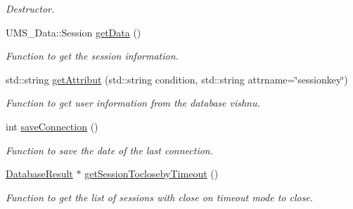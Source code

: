 \begin{DoxyCompactItemize}
\begin{DoxyCompactList}\small\item\em Destructor. \item\end{DoxyCompactList}\item 
UMS\_\-Data::Session \hyperlink{classSessionServer_a4c23b390fd8d49b83f34a57c1d7e1b23}{getData} ()
\begin{DoxyCompactList}\small\item\em Function to get the session information. \item\end{DoxyCompactList}\item 
std::string \hyperlink{classSessionServer_af3fce86cf1e28afee1b44ac35b925925}{getAttribut} (std::string condition, std::string attrname=\char`\"{}sessionkey\char`\"{})
\begin{DoxyCompactList}\small\item\em Function to get user information from the database vishnu. \item\end{DoxyCompactList}\item 
int \hyperlink{classSessionServer_a479f3e2aee3b4c5009e8f496612ae9bc}{saveConnection} ()
\begin{DoxyCompactList}\small\item\em Function to save the date of the last connection. \item\end{DoxyCompactList}\item 
\hyperlink{classDatabaseResult}{DatabaseResult} $\ast$ \hyperlink{classSessionServer_a21db5603b7a91581d5860d1b24f38cd5}{getSessionToclosebyTimeout} ()
\begin{DoxyCompactList}\small\item\em Function to get the list of sessions with close on timeout mode to close. \item\end{DoxyCompactList}\end{DoxyCompactItemize}
